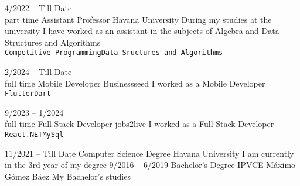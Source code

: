 \documentclass[8pt]{developercv} %
\begin{document}
\begin{entrylist}
	\entry
	{4/2022 -- Till Date\\\footnotesize{part time}}
	{Assistant Professor}
	{Havana University}
	{During my studies at the university I have worked as an assistant in the subjects of Algebra
		and Data Structures and Algorithms\\ \texttt{Competitive Programming}\slashsep\texttt{Data Sructures and Algorithms}}
	
	\entry
	{2/2024 -- Till Date\\\footnotesize{full time}}
	{Mobile Developer}
	{Businessseed}
	{I worked as a Mobile Developer\\ \texttt{Flutter}\slashsep\texttt{Dart}}
	
	\entry
	{9/2023 -- 1/2024\\\footnotesize{full time}}
	{Full Stack Developer}
	{jobs2live}
	{I worked as a Full Stack Developer\\ \texttt{React}\slashsep\texttt{.NET}\slashsep\texttt{MySql}}
	
\end{entrylist}



\begin{entrylist}
	\entry
	{11/2021 -- Till Date}
	{Computer Science Degree}
	{Havana University}
	{I am currently in the 3rd year of my degree}
	\entry
	{9/2016 -- 6/2019}
	{Bachelor's Degree}
	{IPVCE M\'aximo G\'omez B\'aez}
	{My Bachelor's studies}
\end{entrylist}

\end{document}
